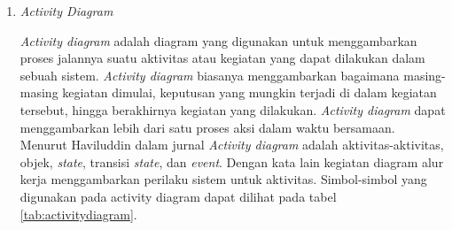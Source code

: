 \begin{enumerate}
\begin{table}[h!]
\begin{center}
\begin{tabular} { |>{\centering\arraybackslash}p{5cm}|p{6cm}| }
\end{tabular}
\end{center}

\end{table}

	\item \textit{Activity Diagram}

	\textit{Activity diagram} adalah diagram yang digunakan untuk menggambarkan proses jalannya suatu aktivitas atau kegiatan yang dapat dilakukan dalam sebuah sistem. \textit{Activity diagram} biasanya menggambarkan bagaimana masing-masing kegiatan dimulai, keputusan yang mungkin terjadi di dalam kegiatan tersebut, hingga berakhirnya kegiatan yang dilakukan. \textit{Activity diagram} dapat menggambarkan lebih dari satu proses aksi dalam waktu bersamaan. Menurut Haviluddin dalam jurnal \cite{Suendri2018} \textit{Activity diagram} adalah aktivitas-aktivitas, objek, \textit{state}, transisi \textit{state}, dan \textit{event}. Dengan kata lain kegiatan diagram alur kerja menggambarkan perilaku sistem untuk aktivitas. Simbol-simbol yang digunakan pada activity diagram dapat dilihat pada tabel \ref{tab:activitydiagram}.


\end{enumerate}
